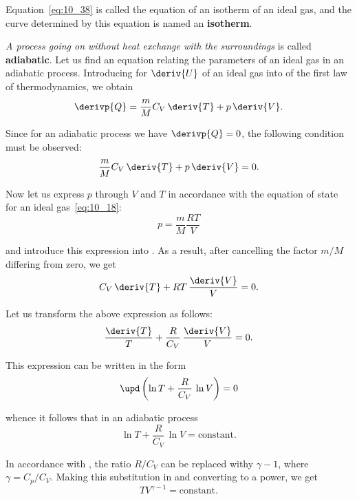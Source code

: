 \noindent
Equation~\eqref{eq:10_38} is called the equation of an isotherm of an ideal gas, and the curve determined by this equation is named an \textbf{isotherm}.

\textit{A process going on without heat exchange with the surroundings} is called \textbf{adiabatic}. Let us find an equation relating the parameters of an ideal gas in an adiabatic process. Introducing  for $\deriv{U}$ of an ideal gas into  of the first law of thermodynamics, we obtain
\begin{equation*}
	\derivp{Q} = \frac{m}{M}C_V\,\deriv{T} + p\,\deriv{V}.
\end{equation*}

\noindent
Since for an adiabatic process we have $\derivp{Q}=0$, the following condition must be observed:
\begin{equation}\label{eq:10_39}
	\frac{m}{M}C_V\,\deriv{T} + p\,\deriv{V} = 0.
\end{equation}

Now let us express $p$ through $V$ and $T$ in accordance with the equation of state for an ideal gas~\eqref{eq:10_18}:
\begin{equation*}
	p = \frac{m}{M}\frac{RT}{V}
\end{equation*}

\noindent
and introduce this expression into . As a result, after cancelling the factor $m/M$ differing from zero, we get
\begin{equation*}
	C_V\,\deriv{T} + RT\,\frac{\deriv{V}}{V} = 0.
\end{equation*}

\noindent
Let us transform the above expression as follows:
\begin{equation*}
	\frac{\deriv{T}}{T} + \frac{R}{C_V}\,\frac{\deriv{V}}{V} = 0.
\end{equation*}

\noindent
This expression can be written in the form
\begin{equation*}
	\upd\left(\ln{T} + \frac{R}{C_V}\,\ln{V}\right) = 0
\end{equation*}

\noindent
whence it follows that in an adiabatic process
\begin{equation}\label{eq:10_40}
	\ln{T} + \frac{R}{C_V}\,\ln{V} = \text{constant}.
\end{equation}

In accordance with , the ratio $R/C_V$ can be replaced withy $\gamma - 1$, where $\gamma=C_p/C_V$. Making this substitution in  and converting to a power, we get
\begin{equation}\label{eq:10_41}
	T V^{\gamma - 1} = \text{constant}.
\end{equation}

